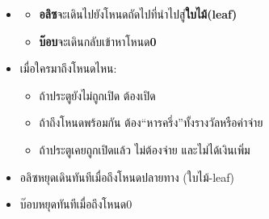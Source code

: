 \documentclass{article}
\begin{document}
\begin{itemize}

\tightlist

\item

  \begin{itemize}

  \tightlist

  \item

    \textbf{อลิซ}จะเดินไปยังโหนดถัดไปที่นำไปสู่\textbf{ใบไม้(leaf)}

  \item

    \textbf{บ๊อบ}จะเดินกลับเข้าหาโหนด\textbf{0}

  \end{itemize}

\item

  เมื่อใครมาถึงโหนดไหน:



  \begin{itemize}

  \tightlist

  \item

    ถ้าประตูยังไม่ถูกเปิด ต้องเปิด

  \item

    ถ้าถึงโหนดพร้อมกัน ต้อง``หารครึ่ง''ทั้งรางวัลหรือค่าจ่าย

  \item

    ถ้าประตูเคยถูกเปิดแล้ว ไม่ต้องจ่าย และไม่ได้เงินเพิ่ม

  \end{itemize}

\end{itemize}



\begin{itemize}

\tightlist

\item

  อลิซหยุดเดินทันทีเมื่อถึงโหนดปลายทาง (ใบไม้-leaf)

\end{itemize}



\begin{itemize}

\tightlist

\item

  บ๊อบหยุดทันทีเมื่อถึงโหนด0

\end{itemize}
\end{document}
